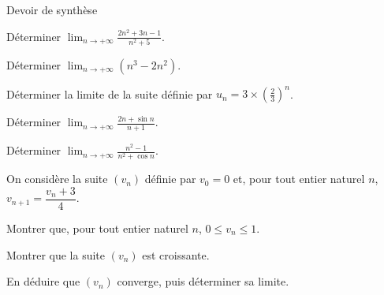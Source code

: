 \begin{exercice}[3]{Devoir de synthèse}
\begin{questions}
  \item Déterminer $\displaystyle\lim_{n\to+\infty}\frac{2n^{2}+3n-1}{n^{2}+5}$.
  \item Déterminer $\displaystyle\lim_{n\to+\infty}\left(n^{3}-2n^{2}\right)$.
  \item Déterminer la limite de la suite définie par $u_n=3\times\left(\frac{2}{3}\right)^{n}$.
\end{questions}
\begin{questions}[resume]
  \item Déterminer $\displaystyle\lim_{n\to+\infty}\frac{2n+\sin n}{n+1}$.
  \item Déterminer $\displaystyle\lim_{n\to+\infty}\frac{n^{2}-1}{n^{2}+\cos n}$.
\end{questions}
On considère la suite $(v_n)$ définie par $v_0=0$ et, pour tout entier naturel $n$, $v_{n+1}=\dfrac{v_n+3}{4}$.
\begin{questions}[resume]
  \item Montrer que, pour tout entier naturel $n$, $0\leq v_n\leq1$.
  \item Montrer que la suite $(v_n)$ est croissante.
  \item En déduire que $(v_n)$ converge, puis déterminer sa limite.
\end{questions}
\end{exercice}

